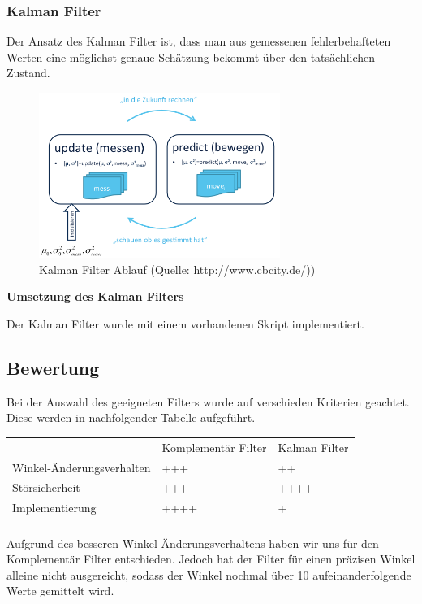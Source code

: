   
\subsubsection{Kalman Filter}
Der Ansatz des Kalman Filter ist, dass man aus gemessenen fehlerbehafteten Werten eine möglichst genaue Schätzung bekommt über den tatsächlichen Zustand. 
\begin{figure}[h]  %
\centering\includegraphics[width=0.7\textwidth]{images/Kalman-Filterstruktur.png}
\caption{Kalman Filter Ablauf \newline (Quelle: http://www.cbcity.de/))}
\label{Sturktur Kalman Filter} %
\end{figure}

\textbf{Umsetzung des Kalman Filters}

Der Kalman Filter wurde mit einem vorhandenen Skript implementiert.

\subsection{Bewertung}
Bei der Auswahl des geeigneten Filters wurde auf verschieden Kriterien geachtet. Diese werden in nachfolgender Tabelle aufgeführt.


\begin{tabular}{lll}
& Komplementär Filter & Kalman Filter\\
Winkel-Änderungsverhalten & +++& ++ \\
Störsicherheit & +++ &++++\\
Implementierung &++++ &+\\	
&&\\	
\end{tabular}

Aufgrund des besseren Winkel-Änderungsverhaltens haben wir uns für den Komplementär Filter entschieden. Jedoch hat der Filter für einen präzisen Winkel alleine nicht ausgereicht, sodass der Winkel nochmal über 10 aufeinanderfolgende Werte gemittelt wird.







\newpage

